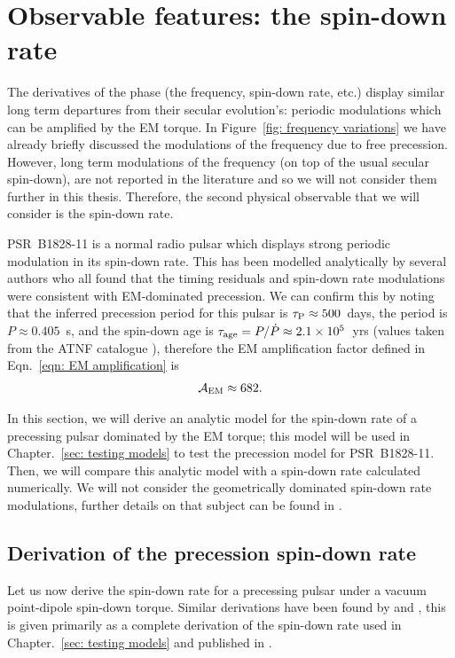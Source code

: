 \documentclass[../full_thesis/full_thesis.tex]{subfiles}
\begin{document}
\section{Observable features: the spin-down rate}
\label{sec: observable features: spin-down rate}

The derivatives of the phase (the frequency, spin-down rate, etc.) display
similar long term departures from their secular evolution's: periodic
modulations which can be amplified by the EM torque. In Figure~\ref{fig:
frequency variations} we have already briefly discussed the modulations of the
frequency due to free precession. However, long term modulations of the
frequency (on top of the usual secular spin-down), are not reported in the
literature and so we will not consider them further in this thesis. Therefore,
the second physical observable that we will consider is the spin-down rate.

PSR~B1828-11 is a normal radio pulsar which displays strong periodic modulation
in its spin-down rate. This has been modelled analytically by several authors
\citep{Stairs2000, Jones2001, Link2001, Akgun2006} who all found that the timing
residuals and spin-down rate modulations were consistent with EM-dominated
precession. We can confirm this by noting that the inferred precession period for this
pulsar is $\tau_{\mathrm{P}} \approx 500$~days, the period is $P\approx0.405$~s, and
the spin-down age is $\tau_{\mathrm{age}} = P/\dot{P} \approx 2.1 \times10^{5}$~yrs (values
taken from the ATNF catalogue \citet{ATNF}), therefore the EM amplification factor
defined in Eqn.~\ref{eqn: EM amplification} is
\begin{align}
\mathcal{A}_{\mathrm{EM}} \approx 682.
\end{align}

In this section, we will derive an analytic model for the spin-down rate of a
precessing pulsar dominated by the EM torque; this model will be used in
Chapter.~\ref{sec: testing models} to test the precession model for
PSR~B1828-11. Then, we will compare this analytic model with a spin-down rate
calculated numerically. We will not consider the geometrically dominated
spin-down rate modulations, further details on that subject can be found in
\citet{Jones2001}.

\subsection{Derivation of the precession spin-down rate}
\label{sec: derivation of the spin-down rate}
Let us now derive the spin-down rate for a precessing pulsar under a
vacuum point-dipole spin-down torque. Similar derivations have been found by
\citet{Link2001} and \citet{Jones2001}, this is given primarily as a complete
derivation of the spin-down rate used in Chapter.~\ref{sec: testing models}
and published in \citet{Ashton2016}.
\end{document}
